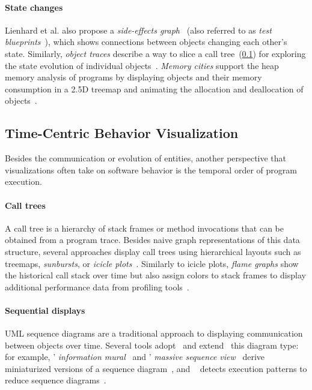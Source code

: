 \paragraph{State changes}

Lienhard et al. also propose a \emph{side-effects graph}~\cite{lienhard2009flow,fierz2009compass} (also referred to as \emph{test blueprints}~\cite{lienhard2008test}), which shows connections between objects changing each other's state.
Similarly, \emph{object traces} describe a way to slice a call tree~(\cref{sec:related_work/time_centric}) for exploring the state evolution of individual objects~\cite{thiede2023object}.
\emph{Memory cities} support the heap memory analysis of programs by displaying objects and their memory consumption in a 2.5D treemap and animating the allocation and deallocation of objects~\cite{weninger2020memory}.

\subsection{Time-Centric Behavior Visualization}
\label{sec:related_work/time_centric}

Besides the communication or evolution of entities, another perspective that visualizations often take on software behavior is the temporal order of program execution.

\paragraph{Call trees}

A call tree is a hierarchy of stack frames or method invocations that can be obtained from a program trace.
Besides naive graph representations of this data structure, several approaches display call trees using hierarchical layouts such as treemaps, \emph{sunbursts}, or \emph{icicle plots}~\cite{kruskal1983icicle,trumper2012viewfusion,woodburn2019interactive}.
Similarly to icicle plots, \emph{flame graphs} show the historical call stack over time but also assign colors to stack frames to display additional performance data from profiling tools~\cite{gregg2016flame}.

\paragraph{Sequential displays}

UML sequence diagrams are a traditional approach to displaying communication between objects over time.
Several tools adopt~\cite{systä2001shimba} and extend~\cite{hamouLhadj2004survey} this diagram type: for example, ' \emph{information mural}~\cite{jerding1998information} and ' \emph{massive sequence view}~\cite{cornelissen2009trace} derive miniaturized versions of a sequence diagram~\cite[sec. 3.4]{lemieux2006visualization}, and ~\cite{dePauw1998execution} detects execution patterns to reduce sequence diagrams~\cite{hamouLhadj2004survey}.
